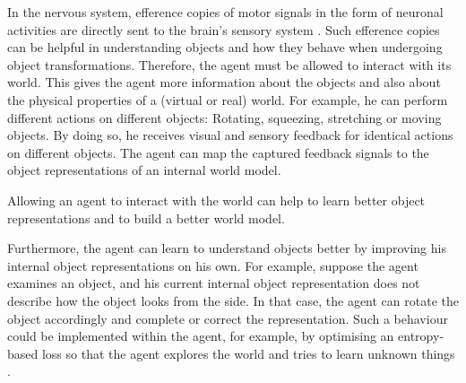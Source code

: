 In the nervous system, efference copies of motor signals in the form of neuronal activities are directly sent to the brain’s sensory system .
Such efference copies can be helpful in understanding objects and how they behave when undergoing object transformations.
Therefore, the agent must be allowed to interact with its world.
This gives the agent more information about the objects and also about the physical properties of a (virtual or real) world. For example, he can perform different actions on different objects: Rotating, squeezing, stretching or moving objects. By doing so, he receives visual and sensory feedback for identical actions on different objects.
The agent can map the captured feedback signals to the object representations of an internal world model.

\begin{claim}
	Allowing an agent to interact with the world can help to learn better object representations and to build a better world model.
\end{claim}

Furthermore, the agent can learn to understand objects better by improving his internal object representations on his own. For example, suppose the agent examines an object, and his current internal object representation does not describe how the object looks from the side. In that case, the agent can rotate the object accordingly and complete or correct the representation. 
Such a behaviour could be implemented within the agent, for example, by optimising an entropy-based loss so that the agent explores the world and tries to learn unknown things .
























